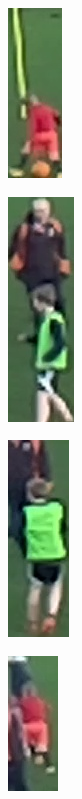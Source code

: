 \documentclass{article}
\begin{document}
\begin{figure}[h!]
\centering
  \begin{subfigure}[b]{0.25\linewidth}
  \centering
    \includegraphics[scale=0.4]{report/pic/4/neg_1.jpg} 
    \caption{}
  \end{subfigure}
  \begin{subfigure}[b]{0.25\linewidth}
  \centering
    \includegraphics[scale=0.4]{report/pic/4/neg_2.jpg} 
    \caption{}
  \end{subfigure}
  \begin{subfigure}[b]{0.25\linewidth}
  \centering
    \includegraphics[scale=0.4]{report/pic/4/neg_3.jpg}
    \caption{} 
  \end{subfigure}
  \begin{subfigure}[b]{0.25\linewidth}
  \centering
    \includegraphics[scale=0.4]{report/pic/4/neg_4.jpg} 

\end{subfigure}
\end{figure}
\end{document}
